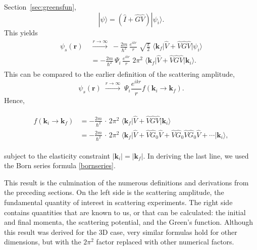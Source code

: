 \documentclass[pra,12pt]{revtex4}
\begin{document}
Section~\ref{sec:greensfun},
\begin{equation}
  |\psi\rangle = \left(\hat{I} + \hat{G}\hat{V}\right)|\psi_i\rangle.
\end{equation}
This yields
\begin{align}
  \begin{aligned}\psi_s(\mathbf{r}) \; &\overset{r\rightarrow\infty}{\longrightarrow} \; - \frac{2m}{\hbar^2} \, \frac{e^{ikr}}{r} \; \sqrt{\frac{\pi}{2}} \; \big\langle \mathbf{k}_f \big|\hat{V} + \hat{V}\hat{G}\hat{V}\big|\psi_i\big\rangle \\ &= - \frac{2m}{\hbar^2} \, \Psi_i\, \frac{e^{ikr}}{r} \; 2\pi^2 \; \big\langle \mathbf{k}_f \big|\hat{V} + \hat{V}\hat{G}\hat{V}\big|\mathbf{k}_i\big\rangle.\end{aligned}
\end{align}
This can be compared to the earlier definition of the scattering amplitude,
\begin{equation}
  \psi_s(\mathbf{r}) \; \overset{r\rightarrow\infty}{\longrightarrow} \; \Psi_i \frac{e^{ikr}}{r} f(\mathbf{k}_i\rightarrow \mathbf{k}_f ).
\end{equation}
Hence,
\begin{framed}
  \begin{align}
    \begin{aligned}
      f(\mathbf{k}_i \rightarrow \mathbf{k}_f) &= - \frac{2m}{\hbar^2} \,\cdot \, 2\pi^2 \; \big\langle \mathbf{k}_f\big| \hat{V} + \hat{V}\hat{G} \hat{V} \big|\mathbf{k}_i\big\rangle \\
      &= - \frac{2m}{\hbar^2} \,\cdot \, 2\pi^2 \; \big\langle \mathbf{k}_f\big| \hat{V} + \hat{V}\hat{G}_0 \hat{V} + \hat{V} \hat{G}_0 \hat{V} \hat{G}_0\hat{V} + \cdots \big|\mathbf{k}_i\big\rangle,  \end{aligned}
  \end{align}
\end{framed}
\vskip -0.15in
\noindent
subject to the elasticity constraint $|\mathbf{k}_i| =
|\mathbf{k}_f|$.  In deriving the last line, we used the Born series
formula \eqref{bornseries}.

This result is the culmination of the numerous definitions and
derivations from the preceding sections.  On the left side is the
scattering amplitude, the fundamental quantity of interest in
scattering experiments.  The right side contains quantities that are
known to us, or that can be calculated: the initial and final momenta,
the scattering potential, and the Green's function.  Although this
result was derived for the 3D case, very similar formulas hold for
other dimensions, but with the $2\pi^2$ factor replaced with other
numerical factors.
\end{document}
